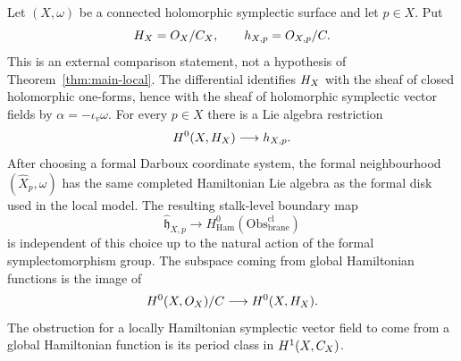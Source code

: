 \documentclass[11pt]{memoir}
\begin{document}
\begin{prop}\label{prop:formal-local-global-restriction}
  Let $(X,\omega)$ be a connected holomorphic symplectic surface and let
  $p\in X$. Put
  $$H_X=O_X/C_X,\qquad
    h_{X,p}=O_{X,p}/C.$$
  This is an external comparison statement, not a hypothesis of
  Theorem~\ref{thm:main-local}.
  The differential identifies $H_X$ with the sheaf of closed holomorphic
  one-forms, hence with the sheaf of holomorphic symplectic vector fields by
  $\alpha=-\iota_v\omega$. For every $p\in X$ there is a Lie algebra
  restriction
  $$H^0(X,H_X)\longrightarrow h_{X,p}.$$
  After choosing a formal Darboux coordinate system, the formal
  neighbourhood $(\widehat X_p,\omega)$ has the same completed
  Hamiltonian Lie algebra as the formal disk used in the local model. The
  resulting stalk-level boundary map
  $$\widehat{\mathfrak h}_{X,p}\longrightarrow
    H^0_{\mathrm{Ham}}(\mathrm{Obs}^{\mathrm{cl}}_{\mathrm{brane}})$$
  is independent of this choice up to the natural action of the formal
  symplectomorphism group. The subspace coming from global Hamiltonian
  functions is the image of
  $$H^0(X,O_X)/C\longrightarrow H^0(X,H_X).$$
  The obstruction for a locally Hamiltonian symplectic vector field to come
  from a global Hamiltonian function is its period class in $H^1(X,C_X)$.
\end{prop}
\end{document}

